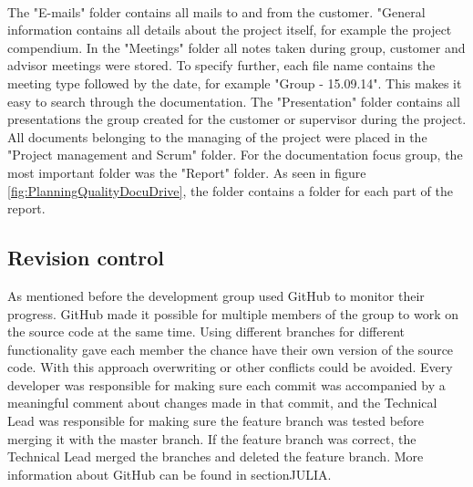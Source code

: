 \paragraph{} The "E-mails" folder contains all mails to and from the customer. "General information contains all details about the project itself, for example the project compendium. In the "Meetings" folder all notes taken during group, customer and advisor meetings were stored. To specify further, each file name contains the meeting type followed by the date, for example "Group - 15.09.14". This makes it easy to search through the documentation. The "Presentation" folder contains all presentations the group created for the customer or supervisor during the project. All documents belonging to the managing of the project were placed in the "Project management and Scrum" folder. For the documentation focus group, the most important folder was the "Report" folder. As seen in figure \ref{fig:PlanningQualityDocuDrive}, the folder contains a folder for each part of the report.

\subsection{Revision control}
\label{subsec:PlanningQualityRev}
As mentioned before the development group used GitHub to monitor their progress. GitHub made it possible for multiple members of the group to work on the source code at the same time. 
Using different branches for different functionality gave each member the chance have their own version of the source code. With this approach overwriting or other conflicts could be avoided. Every developer was responsible for making sure each commit was accompanied by a meaningful comment about changes made in that commit, and the Technical Lead was responsible for making sure the feature branch was tested before merging it with the master branch. If the feature branch was correct, the Technical Lead merged the branches and deleted the feature branch. More information about GitHub can be found in sectionJULIA. %


